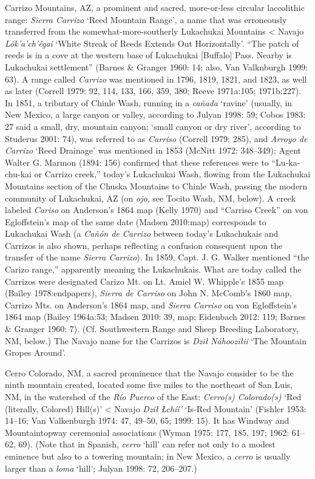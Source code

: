 Carrizo Mountains, AZ, a prominent and sacred, more-or-less circular laccolithic range:  \textit{Sierra Carrizo} ‘Reed Mountain Range’, a name that was erroneously transferred from the somewhat-more-southerly Lukachukai Mountains {\textless} Navajo \textit{Lók’a’ch’égai} ‘White Streak of Reeds Extends Out Horizontally’.  “The patch of reeds is in a cove at the western base of Lukachukai [Buffalo] Pass.  Nearby is Lukachukai settlement” (Barnes \& Granger 1960: 14; also, Van Valknburgh 1999: 63).  A range called \textit{Carrizo} was mentioned in 1796, 1819, 1821, and 1823, as well as later (Correll 1979: 92, 114, 133, 166, 359, 380; Reeve 1971a:105; 1971b:227).  In 1851, a tributary of Chinle Wash, running in a \textit{cañada} ‘ravine’ (usually, in New Mexico, a large canyon or valley, according to Julyan 1998: 59; Cobos 1983: 27 said a small, dry, mountain canyon; ‘small canyon or dry river’, according to Studerus 2001: 74), was referred to as \textit{Carriso} (Correll 1979: 285), and \textit{Arroyo de Carrizo} ‘Reed Drainage’ was mentioned in 1853 (McNitt 1972: 348–349); Agent Walter G. Marmon (1894: 156) confirmed that these references were to “Lu-ka-chu-kai or Carrizo creek,” today’s Lukachukai Wash, flowing from the Lukachukai Mountains section of the Chuska Mountains to Chinle Wash, passing the modern community of Lukachukai, AZ (on \textit{ojo}, see Tocito Wash, NM, below).  A creek labeled \textit{Cariso} on Anderson’s 1864 map (Kelly 1970) and “Carriso Creek” on von Egloffstein’s map of the same date (Madsen 2010:map) corresponds to Lukachukai Wash (a \textit{Cañón de Carrizo} between today’s Lukachukais and Carrizos is also shown, perhaps reflecting a confusion consequent upon the transfer of the name \textit{Sierra Carrizo}).  In 1859, Capt. J. G. Walker mentioned “the Carizo range,” apparently meaning the Lukachukais.  What are today called the Carrizos were designated Carizo Mt. on Lt. Amiel W. Whipple’s 1855 map (Bailey 1978:endpapers), \textit{Sierra de Carriso} on John N. McComb’s 1860 map, Carrizo Mts. on Anderson’s 1864 map, and \textit{Sierra Carriso} on von Egloffstein’s 1864 map (Bailey 1964a:53; Madsen 2010: 39, map; Eidenbach 2012: 119; Barnes \& Granger 1960: 7).  (Cf. Southwestern Range and Sheep Breeding Laboratory, NM, below.)  The Navajo name for the Carrizos is \textit{Dził Náhooziłii} ‘The Mountain Gropes Around’.

Cerro Colorado, NM, a sacred prominence that the Navajo consider to be the ninth mountain created, located some five miles to the northeast of San Luis, NM, in the watershed of the \textit{Río Puerco} of the East: \textit{Cerro(s) Colorado(s)} ‘Red (literally, Colored) Hill(s)’ {\textless} Navajo \textit{Dził Łchíí’} ‘Is-Red Mountain’ (Fishler 1953: 14–16; Van Valkenburgh 1974: 47, 49–50, 65; 1999: 15).  It has Windway and Mountaintopway ceremonial associations (Wyman 1975: 177, 185, 197; 1962: 61–62, 69).  (Note that in Spanish, \textit{cerro} ‘hill’ can refer not only to a modest eminence but also to a towering mountain; in New Mexico, a \textit{cerro} is usually larger than a \textit{loma} ‘hill’; Julyan 1998: 72, 206–207.)

